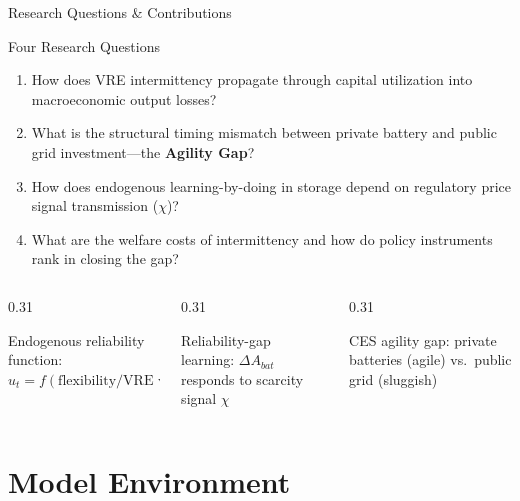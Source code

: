 \documentclass[aspectratio=169,10pt]{beamer}
\begin{document}
\begin{frame}{Research Questions \& Contributions}
  \begin{block}{Four Research Questions}
    \begin{enumerate}\small
      \item How does VRE intermittency propagate through capital utilization into macroeconomic output losses?
      \item What is the structural timing mismatch between private battery and public grid investment---the \textbf{Agility Gap}?
      \item How does endogenous learning-by-doing in storage depend on regulatory price signal transmission ($\chi$)?
      \item What are the welfare costs of intermittency and how do policy instruments rank in closing the gap?
    \end{enumerate}
  \end{block}
  \medskip
  \begin{columns}[T]
    \begin{column}{0.31\textwidth}
      \begin{keybox}[title=Contribution 1]
        \small Endogenous reliability function: $u_t = f(\text{flexibility}/\text{VRE vol})$
      \end{keybox}
    \end{column}
    \begin{column}{0.31\textwidth}
      \begin{keybox}[title=Contribution 2]
        \small Reliability-gap learning: $\Delta A_{bat}$ responds to scarcity signal $\chi$
      \end{keybox}
    \end{column}
    \begin{column}{0.31\textwidth}
      \begin{keybox}[title=Contribution 3]
        \small CES agility gap: private batteries (agile) vs.\ public grid (sluggish)
      \end{keybox}
    \end{column}
  \end{columns}
\end{frame}

\section{Model Environment}
\end{document}
